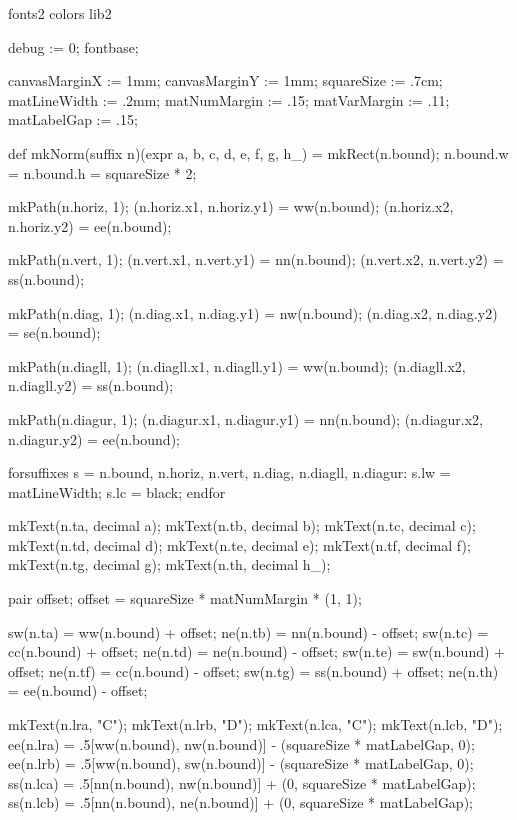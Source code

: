 \environment fonts2
\environment colors
\environment lib2


\startMPinitializations

debug := 0;
fontbase;

canvasMarginX := 1mm;
canvasMarginY := 1mm;
squareSize := .7cm;
matLineWidth := .2mm;
matNumMargin := .15;
matVarMargin := .11;
matLabelGap := .15;


def mkNorm(suffix n)(expr a, b, c, d, e, f, g, h_) =
  mkRect(n.bound);
  n.bound.w = n.bound.h = squareSize * 2;

  mkPath(n.horiz, 1);
  (n.horiz.x1, n.horiz.y1) = ww(n.bound);
  (n.horiz.x2, n.horiz.y2) = ee(n.bound);

  mkPath(n.vert, 1);
  (n.vert.x1, n.vert.y1) = nn(n.bound);
  (n.vert.x2, n.vert.y2) = ss(n.bound);

  mkPath(n.diag, 1);
  (n.diag.x1, n.diag.y1) = nw(n.bound);
  (n.diag.x2, n.diag.y2) = se(n.bound);

  mkPath(n.diagll, 1);
  (n.diagll.x1, n.diagll.y1) = ww(n.bound);
  (n.diagll.x2, n.diagll.y2) = ss(n.bound);

  mkPath(n.diagur, 1);
  (n.diagur.x1, n.diagur.y1) = nn(n.bound);
  (n.diagur.x2, n.diagur.y2) = ee(n.bound);

  forsuffixes s = n.bound, n.horiz, n.vert, n.diag, n.diagll, n.diagur:
    s.lw = matLineWidth;
    s.lc = black;
  endfor

  mkText(n.ta, decimal a);
  mkText(n.tb, decimal b);
  mkText(n.tc, decimal c);
  mkText(n.td, decimal d);
  mkText(n.te, decimal e);
  mkText(n.tf, decimal f);
  mkText(n.tg, decimal g);
  mkText(n.th, decimal h_);

  pair offset;
  offset = squareSize * matNumMargin * (1, 1);

  sw(n.ta) = ww(n.bound) + offset;
  ne(n.tb) = nn(n.bound) - offset;
  sw(n.tc) = cc(n.bound) + offset;
  ne(n.td) = ne(n.bound) - offset;
  sw(n.te) = sw(n.bound) + offset;
  ne(n.tf) = cc(n.bound) - offset;
  sw(n.tg) = ss(n.bound) + offset;
  ne(n.th) = ee(n.bound) - offset;

  mkText(n.lra, "C");
  mkText(n.lrb, "D");
  mkText(n.lca, "C");
  mkText(n.lcb, "D");
  ee(n.lra) = .5[ww(n.bound), nw(n.bound)] - (squareSize * matLabelGap, 0);
  ee(n.lrb) = .5[ww(n.bound), sw(n.bound)] - (squareSize * matLabelGap, 0);
  ss(n.lca) = .5[nn(n.bound), nw(n.bound)] + (0, squareSize * matLabelGap);
  ss(n.lcb) = .5[nn(n.bound), ne(n.bound)] + (0, squareSize * matLabelGap);

